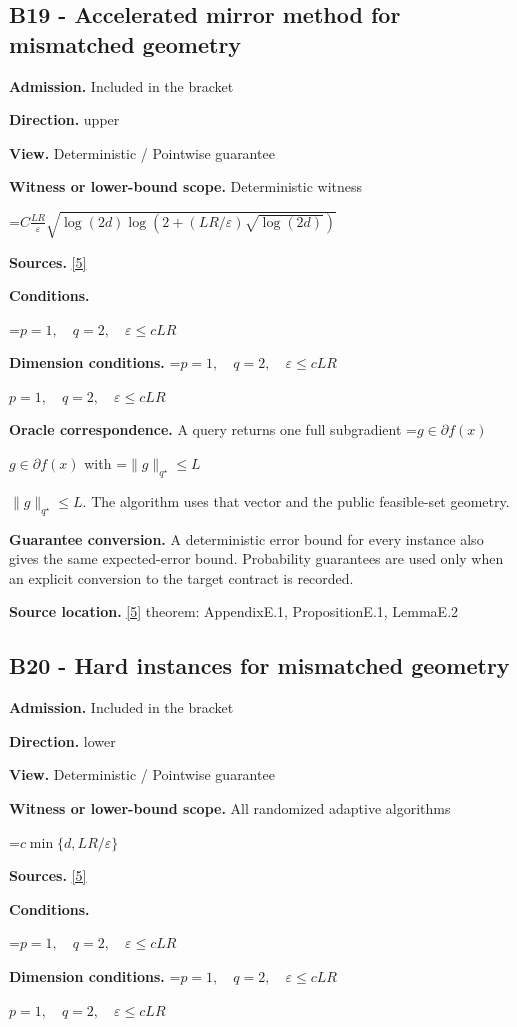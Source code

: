 \documentclass[10pt,a4paper]{article}
\newcommand{\AtlasMath}[1]{\par\begingroup\centering\setbox0=\hbox{$\displaystyle #1$}\ifdim\wd0>1.4\linewidth\typeout{ATLAS WIDE FORMULA: \the\wd0}\fi\ifdim\wd0>\linewidth\resizebox{\linewidth}{!}{\box0}\else\box0\fi\par\endgroup}
\newcommand{\AtlasInlineMath}[1]{\begingroup\setbox0=\hbox{$#1$}\ifdim\wd0>.4\linewidth\endgroup\AtlasMath{#1}\else\endgroup$#1$\fi}
\begin{document}
\subsection{B19 - Accelerated mirror method for mismatched geometry}
\textbf{Admission.} Included in the bracket

\textbf{Direction.} upper

\textbf{View.} Deterministic / Pointwise guarantee

\textbf{Witness or lower-bound scope.} Deterministic witness

\AtlasMath{C\frac{LR}{\varepsilon}\sqrt{\log(2d)\log(2+(LR/\varepsilon)\sqrt{\log(2d)})}}
\textbf{Sources.} \href{https://arxiv.org/pdf/2609.32910}{[5]}

\textbf{Conditions.} 
\AtlasMath{p=1,\quad q=2,\quad\varepsilon\le cLR}


\textbf{Dimension conditions.} \AtlasInlineMath{p=1,\quad q=2,\quad\varepsilon\le cLR}

\textbf{Oracle correspondence.} A query returns one full subgradient \AtlasInlineMath{g\in\partial f(x)} with \AtlasInlineMath{\|g\|_{q^\star}\le L}. The algorithm uses that vector and the public feasible-set geometry.

\textbf{Guarantee conversion.} A deterministic error bound for every instance also gives the same expected-error bound. Probability guarantees are used only when an explicit conversion to the target contract is recorded.

\textbf{Source location.} \href{https://arxiv.org/pdf/2609.32910}{[5]} theorem: AppendixE.1, PropositionE.1, LemmaE.2

\subsection{B20 - Hard instances for mismatched geometry}
\textbf{Admission.} Included in the bracket

\textbf{Direction.} lower

\textbf{View.} Deterministic / Pointwise guarantee

\textbf{Witness or lower-bound scope.} All randomized adaptive algorithms

\AtlasMath{c\min\{d,LR/\varepsilon\}}
\textbf{Sources.} \href{https://arxiv.org/pdf/2609.32910}{[5]}

\textbf{Conditions.} 
\AtlasMath{p=1,\quad q=2,\quad\varepsilon\le cLR}


\textbf{Dimension conditions.} \AtlasInlineMath{p=1,\quad q=2,\quad\varepsilon\le cLR}
\end{document}
